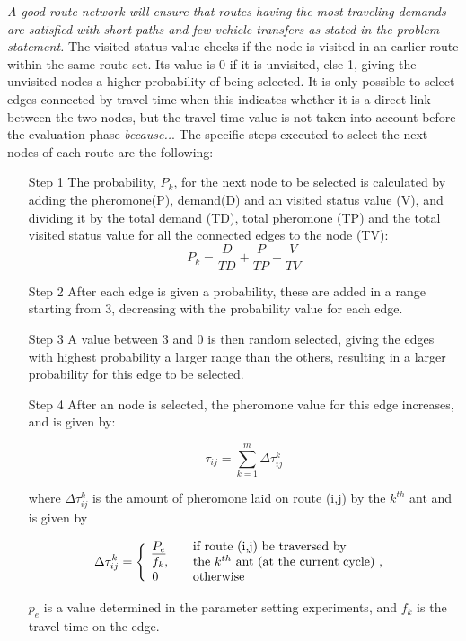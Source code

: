  \emph{\color{red} A good route network will ensure that routes having the most traveling demands are satisfied with short paths and few vehicle transfers as stated in the problem statement.} The visited status value checks if the node is visited in an earlier route within the same route set. Its value is 0 if it is unvisited, else 1, giving the unvisited nodes a higher probability of being selected. It is only possible to select edges connected by travel time when this indicates whether it is a direct link between the two nodes, but the travel time value is not taken into account before the evaluation phase \emph{\color{red} because..}.  %
The specific steps executed to select the next nodes of each route are the following:
\begin{itemize}
\item[Step 1] The probability, $P_k$, for the next node to be selected is calculated by adding the pheromone(P), demand(D) and an visited status value (V), and dividing it by the total demand (TD), total pheromone (TP) and the total visited status value for all the connected edges to the node (TV):
$$ P_{k} = \frac{D}{TD} + \frac{P}{TP} + \frac{V}{TV}$$ 

\item[Step 2] After each edge is given a probability, these are added in a range starting from 3, decreasing with the probability value for each edge. 
\item[Step 3] A value between 3 and 0 is then random selected, giving the edges with highest probability a larger range than the others, resulting in a larger probability for this edge to be selected. 
\item[Step 4] After an node is selected, the pheromone value for this edge increases, and is given by:

$$ \tau_{ij} = \sum_{k=1}^{m} \Delta \tau^k_{ij}$$

where $ \Delta \tau^k_{ij} $ is the amount of pheromone laid on route (i,j) by the $k^{th}$ ant and is given by

$$
\Delta \tau^k_{ij} = \Bigg\{
\begin{array}{l l}
\underline{P_{e}} &  \quad \text{if route (i,j) be traversed by}\\
f_k, &  \quad \text{the $k^{th}$ ant (at the current cycle) , }\\
0 &  \quad \text{otherwise}
\end{array}
$$

$p_e$ is a value determined in the parameter setting experiments, and $f_k$ is the travel time on the edge. 
\end{itemize}